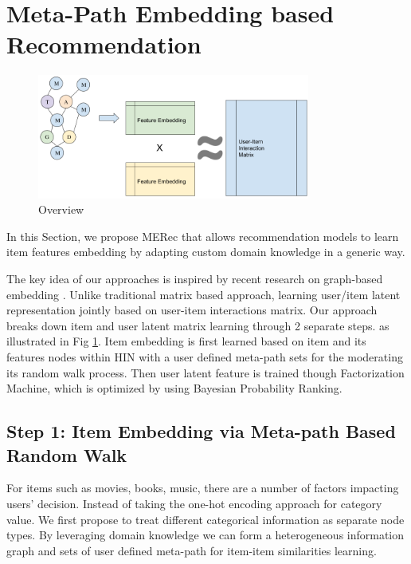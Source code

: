 \section{Meta-Path Embedding based Recommendation}

\begin{figure}[!t]
    \centering
    \includegraphics[width=0.8\textwidth]{figs/fig0.png}
    \caption{Overview}\label{fig:fe-overview}
\end{figure}

In this Section, we propose MERec that allows recommendation models to learn item features embedding by adapting custom domain knowledge in a generic way. 

The key idea of our approaches is inspired by recent research on graph-based embedding \cite{dong2017metapath2vec}. Unlike traditional matrix based approach, learning user/item latent representation jointly based on user-item interactions matrix. Our approach breaks down item and user latent matrix learning through 2 separate steps. as illustrated in Fig \ref{fig:fe-overview}. Item embedding is first learned based on item and its features nodes within HIN with a user defined meta-path sets for the moderating its random walk process. Then user latent feature is trained though Factorization Machine, which is optimized by using Bayesian Probability Ranking.

\subsection{Step 1: Item Embedding via Meta-path Based Random Walk}\label{3MF}

For items such as movies, books, music, there are a number of factors impacting users' decision. Instead of taking the one-hot encoding approach for category value. We first propose to treat different categorical information as separate node types. 
By leveraging domain knowledge we can form a heterogeneous information graph and sets of user defined meta-path for item-item similarities learning. 

